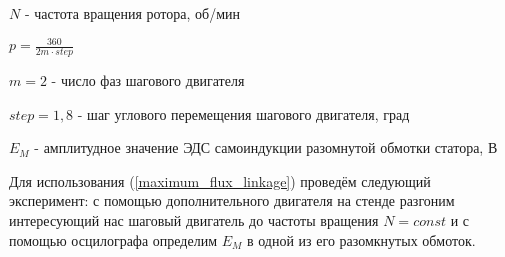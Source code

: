 $N$ - частота вращения ротора, об/мин

$p = \frac{360}{2m \cdot step}$

$m = 2$ - число фаз шагового двигателя

$step = 1,8$ - шаг углового перемещения шагового двигателя, град

$E_{M}$ - амплитудное значение ЭДС самоиндукции разомнутой обмотки статора, В

Для использования (\ref{maximum_flux_linkage}) проведём следующий эксперимент: с помощью дополнительного двигателя на стенде разгоним интересующий нас шаговый двигатель до частоты вращения $N = const$ и с помощью осцилографа определим $E_{M}$ в одной из его разомкнутых обмоток.

\endinput
